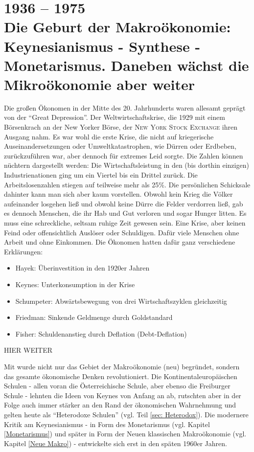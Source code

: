 %
%
%


\part{1936 -- 1975\\Die Geburt der Makroökonomie: Keynesianismus - Synthese - Monetarismus. Daneben wächst die Mikroökonomie aber weiter}

Die großen Ökonomen in der Mitte des 20. Jahrhunderts waren allesamt geprägt von der "`Great Depression"'. Der Weltwirtschaftskrise, die 1929 mit einem Börsenkrach an der New Yorker Börse, der \textsc{New York Stock Exchange} ihren Ausgang nahm. Es war wohl die erste Krise, die nicht auf kriegerische Auseinandersetzungen oder Umweltkatastrophen, wie Dürren oder Erdbeben, zurückzuführen war, aber dennoch für extremes Leid sorgte. Die Zahlen können nüchtern dargestellt werden: Die Wirtschaftsleistung in den (bis dorthin einzigen) Industrienationen ging um ein Viertel bis ein Drittel zurück. Die Arbeitslosenzahlen stiegen auf teilweise mehr als 25\%. Die persönlichen Schicksale dahinter kann man sich aber kaum vorstellen. Obwohl kein Krieg die Völker aufeinander losgehen ließ und obwohl keine Dürre die Felder verdorren ließ, gab es dennoch Menschen, die ihr Hab und Gut verloren und sogar Hunger litten. Es muss eine schreckliche, seltsam ruhige Zeit gewesen sein. Eine Krise, aber keinen Feind oder offensichtlich Auslöser oder Schuldigen. Dafür viele Menschen ohne Arbeit und ohne Einkommen.
Die Ökonomen hatten dafür ganz verschiedene Erklärungen:
\begin{itemize}
	\item Hayek: Überinvestition in den 1920er Jahren
	\item Keynes: Unterkonsumption in der Krise
	\item Schumpeter: Abwärtsbewegung von drei Wirtschaftszyklen gleichzeitig
	\item Friedman: Sinkende Geldmenge durch Goldstandard
	\item Fisher: Schuldenanstieg durch Deflation (Debt-Deflation)
\end{itemize}

HIER WEITER


Mit \textcite{Keynes1936} wurde nicht nur das Gebiet der Makroökonomie (neu) begründet, sondern das gesamte ökonomische Denken revolutioniert. Die Kontinentaleuropäischen Schulen - allen voran die Österreichische Schule, aber ebenso die Freiburger Schule - lehnten die Ideen von Keynes von Anfang an ab, rutschten aber in der Folge auch immer stärker an den Rand der ökonomischen Wahrnehmung und gelten heute als "`Heterodoxe Schulen"' (vgl. Teil \ref{sec: Heterodox}). Die modernere Kritik am Keynesianismus - in Form des Monetarismus (vgl. Kapitel \ref{Monetarismus}) und später in Form der Neuen klassischen Makroökonomie (vgl. Kapitel \ref{Neue Makro}) - entwickelte sich erst in den späten 1960er Jahren. 


